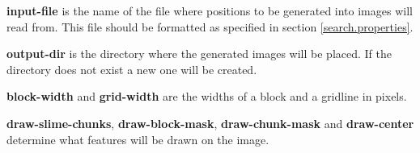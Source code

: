 \documentclass[12pt]{article}
\begin{document}
\textbf{input-file} is the name of the file where positions to be generated into images will read from. This file should be formatted as specified in section \ref{search.properties}.

\textbf{output-dir} is the directory where the generated images will be placed. If the directory does not exist a new one will be created.

\textbf{block-width} and \textbf{grid-width} are the widths of a block and a gridline in pixels.

\textbf{draw-slime-chunks}, \textbf{draw-block-mask}, \textbf{draw-chunk-mask} and \textbf{draw-center} determine what features will be drawn on the image.
\end{document}
